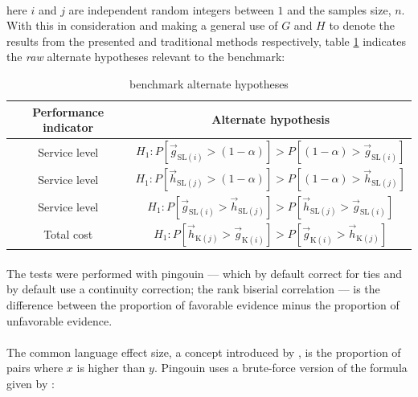 \documentclass[letterpaper]{article}
\begin{document}
\paragraph{}
here $i$ and $j$ are independent random integers between $1$ and the samples size, $n$. With this in consideration and making a general use of $G$ and $H$ to denote the results from the presented and traditional methods respectively,  table \ref{tab:benchmarking_scheme_H1_hyp} indicates the \textit{raw} alternate hypotheses relevant to the benchmark:

\begin{table}[h!]
    \begin{center}
        \begin{tabular}{c|c}
            \toprule
            \textbf{Performance indicator} & \textbf{Alternate hypothesis} \\
            \midrule
            Service level & $H_1: P\left[\vec{g}_{\mathrm{SL}(i)}>(1-\alpha)\right] > P\left[(1-\alpha)>\vec{g}_{\mathrm{SL}(i)}\right]$\\
            \midrule
            Service level & $H_1: P\left[\vec{h}_{\mathrm{SL}(j)}>(1-\alpha)\right] > P\left[(1-\alpha)>\vec{h}_{\mathrm{SL}(j)}\right]$\\
            \midrule
            Service level & $H_1: P\left[\vec{g}_{\mathrm{SL}(i)}>\vec{h}_{\mathrm{SL}(j)}\right] > P\left[\vec{h}_{\mathrm{SL}(j)}>\vec{g}_{\mathrm{SL}(i)}\right]$\\
            \midrule            
            Total cost & $H_1: P\left[\vec{h}_{\mathrm{K}(j)}>\vec{g}_{\mathrm{K}(i)}\right] > P\left[\vec{g}_{\mathrm{K}(i)}>\vec{h}_{\mathrm{K}(j)}\right]$\\
            \bottomrule
        \end{tabular}
    \end{center}
    \caption{benchmark alternate hypotheses}
    \label{tab:benchmarking_scheme_H1_hyp}
\end{table}

\paragraph{}
The tests were performed with pingouin --\cite{Vallat2018}-- which by default correct for ties and by default use a continuity correction; the rank biserial correlation --\cite{kerby2014simple}-- is the difference between the proportion of favorable evidence minus the proportion of unfavorable evidence. 

\paragraph{}
The common language effect size, a concept introduced by \cite{mcgraw1992common}, is the proportion of pairs where $x$ is higher than $y$. Pingouin uses a brute-force version of the formula given by \cite{vargha2000critique}:
\end{document}
